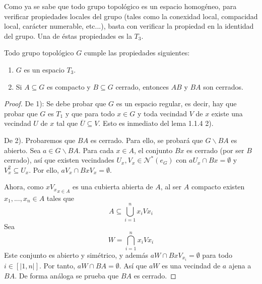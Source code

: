 \documentclass[12pt]{report}
\theoremstyle{largebreak}
\newcommand{\Ns}[1]{\ensuremath{\mathscr{N}^*(#1)}}
\newcommand{\natint}[1]{\ensuremath{\left[\big|#1\big|\right]}}
\begin{document}
    Como ya se sabe que todo grupo topológico es un espacio homogéneo, para verificar propiedades locales del grupo (tales como la conexidad local, compacidad local, carácter numerable, etc...), basta con verificar la propiedad en la identidad del grupo. Una de éstas propiedades es la $T_3$.

    \begin{lema}
        Todo grupo topológico $G$ cumple las propiedades siguientes:
        \begin{enumerate}
            \item $G$ es un espacio $T_3$.
            \item Si $A\subseteq G$ es compacto y $B\subseteq G$ cerrado, entonces $AB$ y $BA$ son cerrados.
        \end{enumerate}
    \end{lema}

    \begin{proof}
        De 1): Se debe probar que $G$ es un espacio regular, es decir, hay que probar que $G$ es $T_1$ y que para todo $x\in G$ y toda vecindad $V$ de $x$ existe una vecindad $U$ de $x$ tal que $\overline{U}\subseteq V$. Esto es inmediato del lema 1.1.4 2).

        De 2). Probaremos que $BA$ es cerrado. Para ello, se probará que $G\backslash BA$ es abierto. Sea $a\in G\backslash BA$. Para cada $x\in A$, el conjunto $Bx$ es cerrado (por ser $B$ cerrado), así que existen vecindades $U_x,V_x\in\Ns{e_G}$ con $aU_x\cap Bx=\emptyset$ y $V_x^2\subseteq U_x$. Por ello, $aV_x\cap BxV_x=\emptyset$.

        Ahora, como ${xV_x}_{x\in A}$ es una cubierta abierta de $A$, al ser $A$ compacto existen $x_1,...,x_n\in A$ tales que
        \begin{equation*}
            A\subseteq\bigcup_{i=1}^n x_iV{x_i}
        \end{equation*}
        Sea
        \begin{equation*}
            W=\bigcap_{i=1}^n x_iV{x_i}
        \end{equation*}
        Este conjunto es abierto y simétrico, y además $aW\cap BxV_{x_i}=\emptyset$ para todo $i\in\natint{1,n}$. Por tanto, $aW\cap BA=\emptyset$. Así que $aW$ es una vecindad de $a$ ajena a $BA$. De forma análoga se prueba que $BA$ es cerrado.
    \end{proof}
\end{document}
